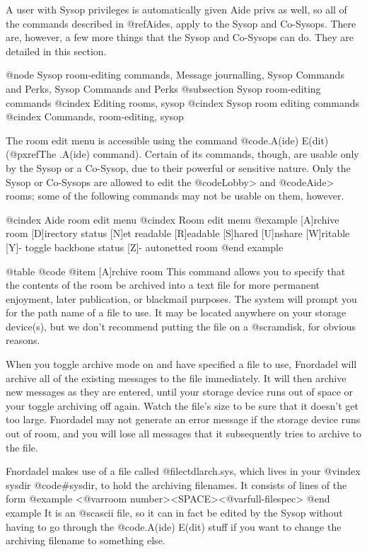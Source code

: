 A user with Sysop privileges is automatically given Aide privs as
well, so all of the commands described in @ref{Aides}, apply to the Sysop and
Co-Sysops.  There are, however, a few more things that the Sysop and Co-Sysops
can do.  They are detailed in this section.

@node Sysop room-editing commands, Message journalling, Sysop Commands and Perks, Sysop Commands and Perks
@subsection Sysop room-editing commands
@cindex Editing rooms, sysop
@cindex Sysop room editing commands
@cindex Commands, room-editing, sysop

The room edit menu is accessible using the command @code{.A(ide) E(dit)}
(@pxref{The .A(ide) command}).
Certain of its commands, though, are
usable only by the Sysop or a Co-Sysop, due to their powerful or sensitive
nature.  Only the Sysop or Co-Sysops are allowed to edit the @code{Lobby>}
and @code{Aide>} rooms; some of the following commands may not be usable on
them, however.

@cindex Aide room edit menu
@cindex Room edit menu
@example
[A]rchive room
[D]irectory status
[N]et readable
[R]eadable
[S]hared
[U]nshare
[W]ritable
[Y]- toggle backbone status
[Z]- autonetted room
@end example

@table @code
@item [A]rchive room
This command allows you to specify that the contents
of the room be archived into a text file for more permanent
enjoyment, later publication, or blackmail purposes.
The system will prompt you for the path name of a file to use.
It may be located anywhere on your storage device(s), but we
don't recommend putting the file on a @sc{ram}disk, for obvious
reasons.

When you toggle archive mode on and have specified a
file to use, Fnordadel will archive all of the existing
messages to the file immediately.  It will then archive new
messages as they are entered, until your storage device runs
out of space or your toggle archiving off again.  Watch the
file's size to be sure that it doesn't get too large.
Fnordadel may not generate an error message if the storage
device runs out of room, and you will lose all messages that
it subsequently tries to archive to the file.

Fnordadel makes use of a file called @file{ctdlarch.sys},
which lives in your
@vindex sysdir
@code{#sysdir}, to hold the archiving filenames.
It consists of lines of the form
@example
<@var{room number}><SPACE><@var{full-filespec}>
@end example
It is an @sc{ascii} file, so it can in fact be edited by the Sysop
without having to go through the @code{.A(ide) E(dit)} stuff if you
want to change the archiving filename to something else.

